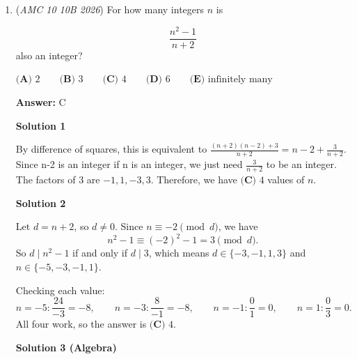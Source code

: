 \begin{enumerate}
 



\textbf{Solution 5}

Each of the 2026 points on the circle is a vertex of exactly one triangular region and two circular regions. Since each circular region has exactly two vertices lying on the circle, we can associate each point with one circular region and the triangular region, giving us two regions per point. Thus, we get $2026\cdot 2=4052$. However, this does not account for the 2026-gon in the middle, so we add 1 to obtain $\boxed{\textbf{(B) }4053}$.

 -C8c8c8c8c-Edits by Happymaths

 


	\item (\textit{AMC 10 10B 2026}) For how many integers $n$ is

 \[\frac{n^2-1}{n+2}\]
also an integer?


 $\textbf{(A) } 2 \qquad \textbf{(B) } 3 \qquad \textbf{(C) } 4 \qquad \textbf{(D) } 6 \qquad \textbf{(E) } \text{infinitely many}$

 \textbf{Answer: }C



\textbf{Solution 1}

By difference of squares, this is equivalent to $\frac{(n+2)(n-2)+3}{n+2}=n-2+\frac{3}{{n+2}}$. Since n-2 is an integer if n is an integer, we just need $\frac{3}{n+2}$ to be an integer. The factors of $3$ are $-1, 1, -3, 3$. Therefore, we have $\boxed{\textbf{(C) } 4}$ values of $n$.

 



\textbf{Solution 2}

Let $d = n + 2$, so $d \neq 0$. Since $n \equiv -2 \pmod{d}$, we have
 \[n^2 - 1 \equiv (-2)^2 - 1 = 3 \pmod{d}.\]So $d \mid n^2 - 1$ if and only if $d \mid 3$, which means $d \in \{-3, -1, 1, 3\}$ and $n \in \{-5, -3, -1, 1\}$.

 Checking each value:
 \[n = -5: \frac{24}{-3} = -8, \qquad n = -3: \frac{8}{-1} = -8, \qquad n = -1: \frac{0}{1} = 0, \qquad n = 1: \frac{0}{3} = 0.\]All four work, so the answer is $\boxed{\textbf{(C) }4}$.

 



\textbf{Solution 3 (Algebra)}


\end{enumerate}
